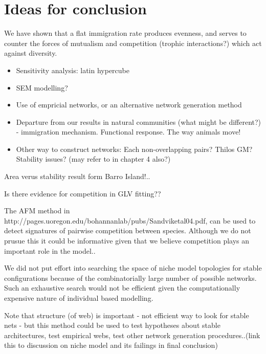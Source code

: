 

\section{Ideas for conclusion}
\label{sec:conc_ideas}

We have shown that a flat immigration rate produces evenness, and serves to counter the forces of mutualism and competition (trophic interactions?) which act against diversity.

\begin{itemize}
	\item Sensitivity analysis: latin hypercube
	\item SEM modelling?
	\item Use of empricial networks, or an alternative network generation method
	
	\item Departure from our results in natural communities (what might be different?) - immigration mechanism. Functional response. The way animals move!
	
	\item Other way to construct networks: Each non-overlapping pairs? Thilos GM? Stability issues? (may refer to in chapter 4 also?)
\end{itemize}

Area verus stability result form Barro Island!..

Is there evidence for competition in GLV fitting??

The AFM method in http://pages.uoregon.edu/bohannanlab/pubs/Sandviketal04.pdf, can be used to detect signatures of pairwise competition between species. Although we do not prusue this it could be informative given that we believe competition plays an important role in the model..

 We did not put effort into searching the space of niche model topologies for stable configurations because of the combinatorially large number of possible networks. Such an exhaustive search would not be efficient given the computationally expensive nature of individual based modelling.  

Note that structure (of web) is important - not efficient way to look for stable nets - but this method could be used to test hypotheses about stable architectures, test empirical webs, test other network generation procedures..(link this to discussion on niche model and its failings in final conclusion)



